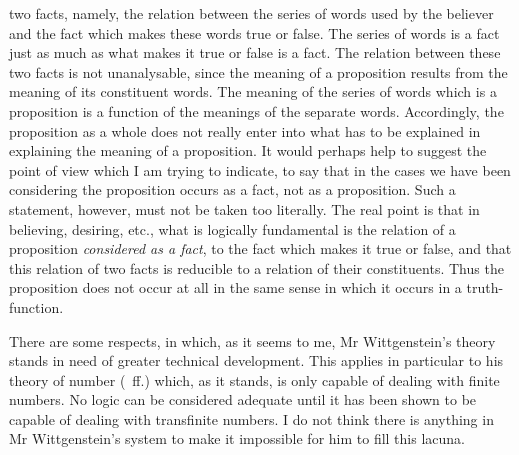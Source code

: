 two facts, namely, the relation between the series of words
used by the believer and the fact which makes these
words true or false. The series of words is a fact just
as much as what makes it true or false is a fact. The
relation between these two facts is not unanalysable, since
the meaning of a proposition results from the meaning
of its constituent words. The meaning of the series of
words which is a proposition is a function of the meanings
of the separate words. Accordingly, the proposition as a
whole does not really enter into what has to be explained
in explaining the meaning of a proposition. It would
perhaps help to suggest the point of view which I am
trying to indicate, to say that in the cases we have been
considering the proposition occurs as a fact, not as a
proposition. Such a statement, however, must not be
taken too literally. The real point is that in believing,
desiring, etc., what is logically fundamental is the relation
of a proposition \emph{considered as a fact}, to the fact which
makes it true or false, and that this relation of two facts
is reducible to a relation of their constituents. Thus the
proposition does not occur at all in the same sense in
which it occurs in a truth-function.

There are some respects, in which, as it seems to me,
Mr Wittgenstein's theory stands in need of greater
technical development. This applies in particular to
his theory of number (~ff.) which, as it stands, is only
capable of dealing with finite numbers. No logic can
be considered adequate until it has been shown to be
capable of dealing with transfinite numbers. I do not
think there is anything in Mr Wittgenstein's system to
make it impossible for him to fill this lacuna.


